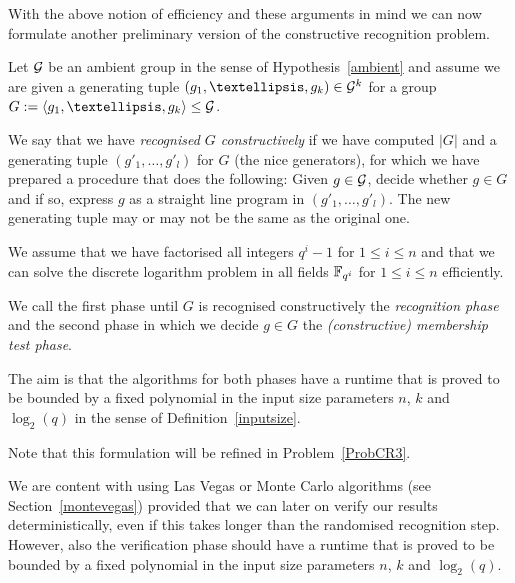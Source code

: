 With the above notion of efficiency and these arguments in mind we can now 
formulate another preliminary version of the constructive recognition problem.

\begin{Problem}
\label{ProbCR2}%
Let $\mathcal{G}$ be an ambient group in the sense of Hypothesis~\ref{ambient} and 
assume we are given a generating tuple $(g_1, \ldots, g_k) \in
\GG^k$ for a group $G := \left< g_1, \ldots, g_k \right> \le \GG$. 

We say that we have \emph{recognised $G$ constructively} if we have 
computed $|G|$ and a
generating tuple $( g'_1, \ldots, g'_l )$ for $G$ (the nice generators), 
for which we have
prepared a procedure that does the following: Given $g \in \mathcal{G}$,
decide whether $g \in G$ and if so, express $g$ as a straight line program
%
in $(g'_1, \ldots, g'_l)$. The new generating tuple may or may not be the
same as the original one.

We assume that we have factorised all integers $q^i-1$ for $1 \le i \le n$
and that we can solve the discrete logarithm problem in all fields
$\mathbb{F}_{q^i}$ for $1 \le i \le n$ efficiently. 

We call the first phase until $G$ is
recognised constructively the \emph{recognition phase} and the second
phase in which we decide $g \in G$ the \emph{(constructive) membership test phase}.

The aim is that the algorithms for both phases have a runtime that is proved
to be bounded by a fixed polynomial in the input size parameters $n$, $k$
and $\log_2(q)$ in the sense of Definition~\ref{inputsize}.
\proofend
\end{Problem}

Note that this formulation will be refined in Problem~\ref{ProbCR3}.

\begin{Rem}
%
We are content with using Las Vegas or Monte Carlo algorithms (see
Section~\ref{montevegas}) provided that we can later on verify our results
deterministically, even if this takes longer than the randomised
recognition step. However, also the verification phase should have a
%
runtime that is proved to be bounded by a fixed polynomial in the input
size parameters $n$, $k$ and $\log_2(q)$.
\end{Rem}

